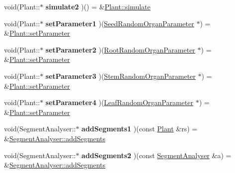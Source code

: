 \begin{DoxyCompactItemize}
void(Plant\+::$\ast$ {\bfseries simulate2} )() = \&\hyperlink{classCPlantBox_1_1Plant_a47d8afff8e281a1760fa4b8046cc4378}{Plant\+::simulate}
\item 
\mbox{\label{namespaceCPlantBox_ac9ab2630f5e7c59c288fc83562ae5e38}} 
void(Plant\+::$\ast$ {\bfseries set\+Parameter1} )(\hyperlink{classCPlantBox_1_1SeedRandomOrganParameter}{Seed\+Random\+Organ\+Parameter} $\ast$) = \&\hyperlink{classCPlantBox_1_1Plant_a19971905d39798d9809ce87f0b51e48d}{Plant\+::set\+Parameter}
\item 
\mbox{\label{namespaceCPlantBox_afb5590d171c9431a7764a1c2a5c5c0ec}} 
void(Plant\+::$\ast$ {\bfseries set\+Parameter2} )(\hyperlink{classCPlantBox_1_1RootRandomOrganParameter}{Root\+Random\+Organ\+Parameter} $\ast$) = \&\hyperlink{classCPlantBox_1_1Plant_a19971905d39798d9809ce87f0b51e48d}{Plant\+::set\+Parameter}
\item 
\mbox{\label{namespaceCPlantBox_aca84dad830a9aff6f15b2d53531c9235}} 
void(Plant\+::$\ast$ {\bfseries set\+Parameter3} )(\hyperlink{classCPlantBox_1_1StemRandomOrganParameter}{Stem\+Random\+Organ\+Parameter} $\ast$) = \&\hyperlink{classCPlantBox_1_1Plant_a19971905d39798d9809ce87f0b51e48d}{Plant\+::set\+Parameter}
\item 
\mbox{\label{namespaceCPlantBox_aaf26dc047c01598980372383c9435654}} 
void(Plant\+::$\ast$ {\bfseries set\+Parameter4} )(\hyperlink{classCPlantBox_1_1LeafRandomOrganParameter}{Leaf\+Random\+Organ\+Parameter} $\ast$) = \&\hyperlink{classCPlantBox_1_1Plant_a19971905d39798d9809ce87f0b51e48d}{Plant\+::set\+Parameter}
\item 
\mbox{\label{namespaceCPlantBox_a853cd2d47e0c8c4c1dd94856521c229f}} 
void(Segment\+Analyser\+::$\ast$ {\bfseries add\+Segments1} )(const \hyperlink{classCPlantBox_1_1Plant}{Plant} \&rs) = \&\hyperlink{classCPlantBox_1_1SegmentAnalyser_a3ff7165b8d0201bddee92b3338b95839}{Segment\+Analyser\+::add\+Segments}
\item 
\mbox{\label{namespaceCPlantBox_af1df7bb47e905f012a4797dda19ebea6}} 
void(Segment\+Analyser\+::$\ast$ {\bfseries add\+Segments2} )(const \hyperlink{classCPlantBox_1_1SegmentAnalyser}{Segment\+Analyser} \&a) = \&\hyperlink{classCPlantBox_1_1SegmentAnalyser_a3ff7165b8d0201bddee92b3338b95839}{Segment\+Analyser\+::add\+Segments}

\end{DoxyCompactItemize}

